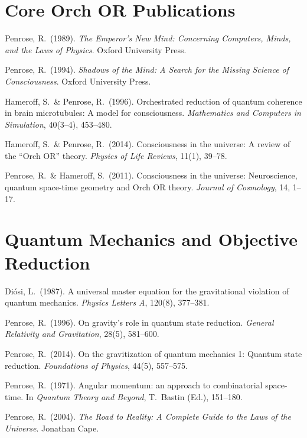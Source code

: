 \documentclass[11pt,a4paper]{report}
\begin{document}
\section*{Core Orch OR Publications}
\begin{enumerate}[label={[\arabic*]}, leftmargin=2.5em]
  \item Penrose, R.\ (1989). \textit{The Emperor's New Mind: Concerning Computers, Minds, and the Laws of Physics}. Oxford University Press.
  \item Penrose, R.\ (1994). \textit{Shadows of the Mind: A Search for the Missing Science of Consciousness}. Oxford University Press.
  \item Hameroff, S.\ \& Penrose, R.\ (1996). Orchestrated reduction of quantum coherence in brain microtubules: A model for consciousness. \textit{Mathematics and Computers in Simulation}, 40(3--4), 453--480.
  \item Hameroff, S.\ \& Penrose, R.\ (2014). Consciousness in the universe: A review of the ``Orch OR'' theory. \textit{Physics of Life Reviews}, 11(1), 39--78.
  \item Penrose, R.\ \& Hameroff, S.\ (2011). Consciousness in the universe: Neuroscience, quantum space-time geometry and Orch OR theory. \textit{Journal of Cosmology}, 14, 1--17.
\end{enumerate}

\section*{Quantum Mechanics and Objective Reduction}
\begin{enumerate}[label={[\arabic*]}, leftmargin=2.5em, start=6]
  \item Di\'osi, L.\ (1987). A universal master equation for the gravitational violation of quantum mechanics. \textit{Physics Letters A}, 120(8), 377--381.
  \item Penrose, R.\ (1996). On gravity's role in quantum state reduction. \textit{General Relativity and Gravitation}, 28(5), 581--600.
  \item Penrose, R.\ (2014). On the gravitization of quantum mechanics 1: Quantum state reduction. \textit{Foundations of Physics}, 44(5), 557--575.
  \item Penrose, R.\ (1971). Angular momentum: an approach to combinatorial space-time. In \textit{Quantum Theory and Beyond}, T.\ Bastin (Ed.), 151--180.
  \item Penrose, R.\ (2004). \textit{The Road to Reality: A Complete Guide to the Laws of the Universe}. Jonathan Cape.
\end{enumerate}
\end{document}
